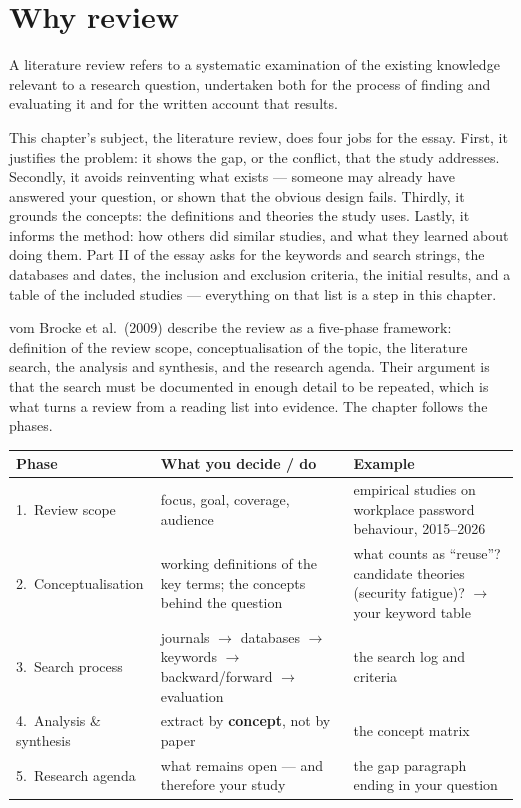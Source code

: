 \documentclass[11pt,a4paper,british,twoside=false,headings=small,chapterprefix=false,numbers=noenddot]{scrbook}
\newenvironment{block}[1]{\begin{tcolorbox}[scriptbox, title={#1}]}{\end{tcolorbox}}
\begin{document}
\section{Why review}

\begin{block}{Literature review}
A literature review refers to a systematic examination of the existing knowledge relevant to a research question, undertaken both for the process of finding and evaluating it and for the written account that results.
\end{block}

This chapter's subject, the literature review, does four jobs for the essay. First, it justifies the problem: it shows the gap, or the conflict, that the study addresses. Secondly, it avoids reinventing what exists --- someone may already have answered your question, or shown that the obvious design fails. Thirdly, it grounds the concepts: the definitions and theories the study uses. Lastly, it informs the method: how others did similar studies, and what they learned about doing them. Part II of the essay asks for the keywords and search strings, the databases and dates, the inclusion and exclusion criteria, the initial results, and a table of the included studies --- everything on that list is a step in this chapter.

vom Brocke et al.\ (2009) describe the review as a five-phase framework: definition of the review scope, conceptualisation of the topic, the literature search, the analysis and synthesis, and the research agenda. Their argument is that the search must be documented in enough detail to be repeated, which is what turns a review from a reading list into evidence. The chapter follows the phases.

\begin{center}\small
  \renewcommand{\arraystretch}{1.15}
  \begin{tabular}{@{}p{3.1cm}p{4.6cm}p{5.4cm}@{}}
    \toprule
    \textbf{Phase} & \textbf{What you decide / do} & \textbf{Example}\\
    \midrule
    1.\ Review scope & focus, goal, coverage, audience & empirical studies on workplace password behaviour, 2015--2026\\
    2.\ Conceptualisation & working definitions of the key terms; the concepts behind the question & what counts as ``reuse''? candidate theories (security fatigue)? $\rightarrow$ your keyword table\\
    3.\ Search process & journals $\rightarrow$ databases $\rightarrow$ keywords $\rightarrow$ backward/forward $\rightarrow$ evaluation & the search log and criteria\\
    4.\ Analysis \& synthesis & extract by \textbf{concept}, not by paper & the concept matrix\\
    5.\ Research agenda & what remains open --- and therefore your study & the gap paragraph ending in your question\\
    \bottomrule
  \end{tabular}
\end{center}
\end{document}
